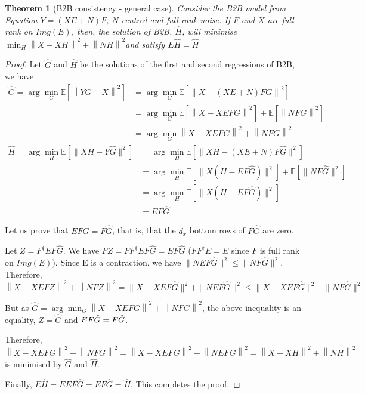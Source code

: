 \documentclass{article}
\newtheorem{theorem}{Theorem}
\begin{document}
\clearpage
 \newpage
 \begin{theorem}[B2B consistency - general case]

     Consider the B2B model from Equation $Y = (XE + N)F$, $N$ centred and full rank noise.
     If $F$ and $X$ are full-rank on $Img(E)$, then, the solution of B2B, $\hat H$, will minimise
     $\min_H  \left \| X - XH\right\| ^2  + \left \| NH\right \| ^2$and satisfy $E\hat H = \hat H$
\end{theorem}
\begin{proof}

 Let $\hat G$ and $\hat H$ be the solutions of the first and second regressions of B2B, we have
 \begin{align*}
    \hat G = \arg \min_G \mathbb{E}[\left \| YG - X \right \|^2] &=   \arg \min_G \mathbb{E}[\left \| X - (XE + N)FG \right\|^2]\\
                                                        &{}= \arg \min_G \mathbb{E}[\left \| X - XEFG\right\| ^2]  + \mathbb{E}[\left \| NFG\right \| ^2]\\
                                                        &{}= \arg \min_G \left \| X - XEFG\right\| ^2  + \left \| NFG\right \| ^2
     \label{eq:doublenorm}
\end{align*}
\begin{align*}
    \hat H = \arg \min_H \mathbb{E}[\| XH - Y \hat{G} \|^2] &=\arg  \min_H \mathbb{E}[\| XH - (XE + N)F \hat G \|^2] \\
    &=\arg \min_H \mathbb{E}[\| X(H - EF \hat G) \| ^2] + \mathbb{E}[\| NF\hat G \| ^2]\\
    &= \arg \min_H \mathbb{E}[\| X(H - EF \hat G) \| ^2]\\
    &= EF \hat G
\end{align*}

Let us prove that $EF\hat G = F\hat G$, that is, that the $d_x$ bottom rows of $F\hat G$ are zero.

 Let $Z=F^\dagger EF\hat G$. We have $FZ = FF^\dagger EF  \hat G= EF\hat G$ ($FF^\dagger E =E$ since $F$ is full rank on $Img(E)$). Since E is a contraction, we have $ \| NEF\hat G\|^2 \leq \| NF\hat G \|^2$. Therefore, 
 $$\left \| X - XEFZ\right \| ^2  + \left \| NFZ\right \| ^2 = \| X - XEF\hat G \| ^2  + \| NEF\hat G \| ^2 \leq \| X - XEF\hat G \| ^2  + \| NF\hat G \| ^2$$

But as $\hat G =  \arg \min_G \left \| X - XEFG\right\| ^2  + \left \| NFG\right \| ^2$, the above inequality is an equality, $Z=\hat G$ and $EF\hat G = F\Hat G$.

Therefore, $\left \| X - XEFG\right \| ^2  + \left \| NFG\right \| ^2 = \left \| X - XEFG\right \| ^2  + \left \| NEFG\right \| ^2 = \left \| X - XH\right \| ^2  + \left \| NH\right \| ^2$ is minimised by $\hat G$ and $\hat H$. 

Finally, $E\hat H = E EF\hat G = EF\hat G = \hat H$. This completes the proof.
\end{proof}
\end{document}
